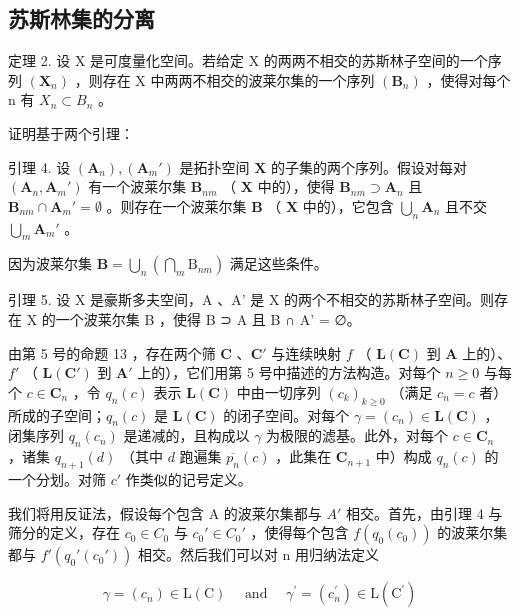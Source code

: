 \subsection{苏斯林集的分离}

定理 2. 设 X 是可度量化空间。若给定 X 的两两不相交的苏斯林子空间的一个序列 \((\mathbf{X}_{n})\) ，则存在 X 中两两不相交的波莱尔集的一个序列 \((\mathbf{B}_{n})\) ，使得对每个 n 有 \(X_{n} \subset B_{n}\) 。

证明基于两个引理：

引理 4. 设 \((\mathbf{A}_n), (\mathbf{A}_m')\) 是拓扑空间 \(\mathbf{X}\) 的子集的两个序列。假设对每对 \((\mathbf{A}_n, \mathbf{A}_m')\) 有一个波莱尔集 \(\mathbf{B}_{nm}\) （ \(\mathbf{X}\) 中的），使得 \(\mathbf{B}_{nm} \supset \mathbf{A}_n\) 且 \(\mathbf{B}_{nm} \cap \mathbf{A}_m' = \emptyset\) 。则存在一个波莱尔集 \(\mathbf{B}\) （ \(\mathbf{X}\) 中的），它包含 \(\bigcup_{n} \mathbf{A}_n\) 且不交 \(\bigcup_{m} \mathbf{A}_m'\) 。

因为波莱尔集 \(\mathbf{B} = \bigcup_{n}\left(\bigcap_{m}\mathrm{B}_{nm}\right)\) 满足这些条件。

引理 5. 设 X 是豪斯多夫空间，A 、A' 是 X 的两个不相交的苏斯林子空间。则存在 X 的一个波莱尔集 B ，使得 B ⊃ A 且 B ∩ A' = ∅。

由第 5 号的命题 13 ，存在两个筛 \(\mathbf{C}\) 、\(\mathbf{C}'\) 与连续映射 \(f\) （ \(\mathbf{L}(\mathbf{C})\) 到 \(\mathbf{A}\) 上的）、\(f'\) （ \(\mathbf{L}(\mathbf{C}')\) 到 \(\mathbf{A}'\) 上的），它们用第 5 号中描述的方法构造。对每个 \(n \geqslant 0\) 与每个 \(c \in \mathbf{C}_n\) ，令 \(q_n(c)\) 表示 \(\mathbf{L}(\mathbf{C})\) 中由一切序列 \((c_k)_{k \geqslant 0}\) （满足 \(c_n = c\) 者）所成的子空间；\(q_n(c)\) 是 \(\mathbf{L}(\mathbf{C})\) 的闭子空间。对每个 \(\gamma = (c_n) \in \mathbf{L}(\mathbf{C})\) ，闭集序列 \(q_n(c_n)\) 是递减的，且构成以 \(\gamma\) 为极限的滤基。此外，对每个 \(c \in \mathbf{C}_n\) ，诸集 \(q_{n+1}(d)\) （其中 \(d\) 跑遍集 \(\overline{p_n}(c)\) ，此集在 \(\mathbf{C}_{n+1}\) 中）构成 \(q_n(c)\) 的一个分划。对筛 \(c'\) 作类似的记号定义。

我们将用反证法，假设每个包含 A 的波莱尔集都与 \(A'\) 相交。首先，由引理 4 与筛分的定义，存在 \(c_{0} \in C_{0}\) 与 \(c_{0}' \in C_{0}'\) ，使得每个包含 \(f(q_{0}(c_{0}))\) 的波莱尔集都与 \(f'(q_{0}'(c_{0}'))\) 相交。然后我们可以对 n 用归纳法定义

\[
\gamma = (c _ {n}) \in \mathrm{L} (\mathrm{C}) \quad \text { and } \quad \gamma^ {\prime} = (c _ {n} ^ {\prime}) \in \mathrm{L} (\mathrm{C} ^ {\prime})
\]


